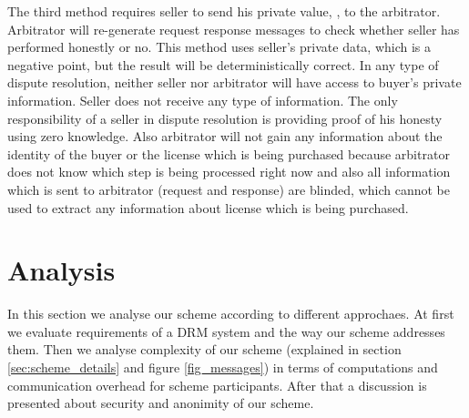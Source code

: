 \documentclass[times]{secauth}
\begin{document}
The third method requires seller to send his private value, , to the arbitrator. Arbitrator will re-generate request response messages to check whether seller has performed honestly or no. This method uses seller's private data, which is a negative point, but the result will be deterministically correct.
In any type of dispute resolution, neither seller nor arbitrator will have access to buyer's private information. Seller does not receive any type of information. The only responsibility of a seller in dispute resolution is providing proof of his honesty using zero knowledge. Also arbitrator will not gain any information about the identity of the buyer or the license which is being purchased because arbitrator does not know which step is being processed right now and also all information which is sent to arbitrator (request and response) are blinded, which cannot be used to extract any information about license which is being purchased.

\section{Analysis}
\label{sec:analysis}
In this section we analyse our scheme according to different approchaes. At first we evaluate requirements of a DRM system and the way our scheme addresses them. Then we analyse complexity of our scheme (explained in section \ref{sec:scheme_details} and figure \ref{fig_messages}) in terms of computations and communication overhead for scheme participants. After that a discussion is presented about security and anonimity of our scheme. 
\end{document}
